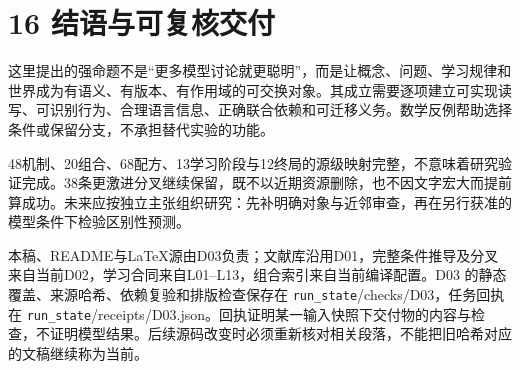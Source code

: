 \documentclass[
  10pt,
]{article}
\begin{document}
\section{16
结语与可复核交付}\label{ux7ed3ux8bedux4e0eux53efux590dux6838ux4ea4ux4ed8}

这里提出的强命题不是``更多模型讨论就更聪明''，而是让概念、问题、学习规律和世界成为有语义、有版本、有作用域的可交换对象。其成立需要逐项建立可实现读写、可识别行为、合理语言信息、正确联合依赖和可迁移义务。数学反例帮助选择条件或保留分支，不承担替代实验的功能。

48机制、20组合、68配方、13学习阶段与12终局的源级映射完整，不意味着研究验证完成。38条更激进分叉继续保留，既不以近期资源删除，也不因文字宏大而提前算成功。未来应按独立主张组织研究：先补明确对象与近邻审查，再在另行获准的模型条件下检验区别性预测。

本稿、README与LaTeX源由D03负责；文献库沿用D01，完整条件推导及分叉来自当前D02，学习合同来自L01--L13，组合索引来自当前编译配置。D03
的静态覆盖、来源哈希、依赖复验和排版检查保存在
\nolinkurl{run_state}/checks/D03，任务回执在
\nolinkurl{run_state}/receipts/D03.json。回执证明某一输入快照下交付物的内容与检查，不证明模型结果。后续源码改变时必须重新核对相关段落，不能把旧哈希对应的文稿继续称为当前。
\end{document}
